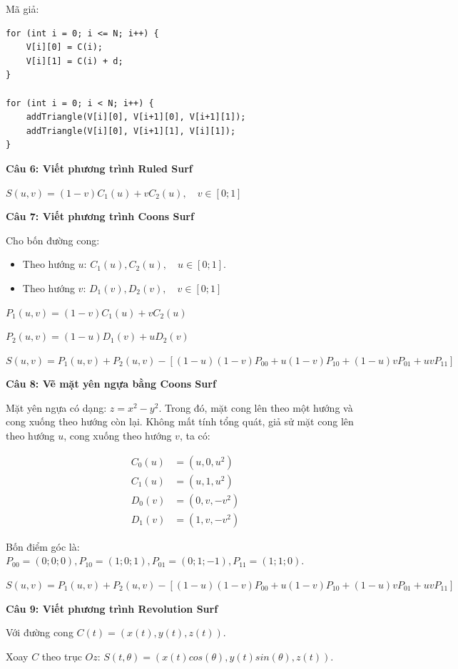 Mã giả:

\begin{lstlisting}
for (int i = 0; i <= N; i++) {
	V[i][0] = C(i);
	V[i][1] = C(i) + d;
}

for (int i = 0; i < N; i++) {
	addTriangle(V[i][0], V[i+1][0], V[i+1][1]);
	addTriangle(V[i][0], V[i+1][1], V[i][1]);
}
\end{lstlisting}

\textbf{Câu 6: Viết phương trình Ruled Surf}

$S(u, v) = (1-v) C_1(u) + v C_2(u), \quad v \in [0; 1]$

\textbf{Câu 7: Viết phương trình Coons Surf}

Cho bốn đường cong:
\begin{itemize}
	\item Theo hướng $u$: $C_1(u), C_2(u), \quad u \in [0; 1]$.
	
	\item Theo hướng $v$: $D_1(v), D_2(v), \quad v \in [0; 1]$
\end{itemize}

$P_1(u, v) = (1-v) C_1(u) + v C_2(u)$

$P_2(u, v) = (1-u) D_1(v) + u D_2(v)$

$S(u, v) = P_1(u, v) + P_2(u, v) - [(1-u)(1-v)P_{00} + u(1-v)P_{10} + (1-u)vP_{01} + uvP_{11}]$

\textbf{Câu 8: Vẽ mặt yên ngựa bằng Coons Surf}

Mặt yên ngựa có dạng: $z = x^2 - y^2$. Trong đó, mặt cong lên theo một hướng và cong xuống theo hướng còn lại. Không mất tính tổng quát, giả sử mặt cong lên theo hướng $u$, cong xuống theo hướng $v$, ta có:

\begin{align*}
	C_0(u) &= (u, 0, u^2) \\
	C_1(u) &= (u, 1, u^2) \\
	D_0(v) &= (0, v, -v^2) \\
	D_1(v) &= (1, v, -v^2)
\end{align*}

Bốn điểm góc là: $P_{00} = (0; 0; 0), P_{10} = (1; 0; 1), P_{01} = (0; 1; -1), P_{11} = (1; 1; 0)$.

$S(u, v) = P_1(u, v) + P_2(u, v) - [(1-u)(1-v)P_{00} + u(1-v)P_{10} + (1-u)vP_{01} + uvP_{11}]$

\textbf{Câu 9: Viết phương trình Revolution Surf}

Với đường cong $C(t) = (x(t), y(t), z(t))$.

Xoay $C$ theo trục $Oz$: $S(t, \theta) = (x(t) cos(\theta), y(t) sin(\theta), z(t))$.

